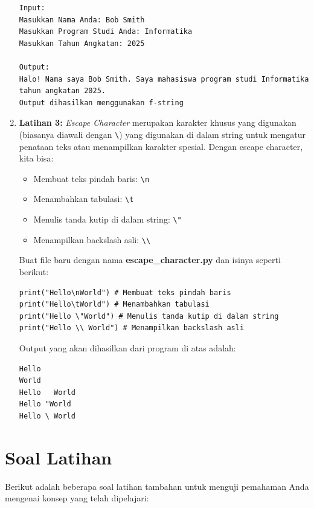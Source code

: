 \begin{enumerate}
\begin{verbatim}
Input:
Masukkan Nama Anda: Bob Smith
Masukkan Program Studi Anda: Informatika
Masukkan Tahun Angkatan: 2025

Output:
Halo! Nama saya Bob Smith. Saya mahasiswa program studi Informatika tahun angkatan 2025. 
Output dihasilkan menggunakan f-string
\end{verbatim}

\item \textbf{Latihan 3:} \textit{Escape Character} merupakan karakter khusus yang digunakan (biasanya diawali dengan \texttt{\textbackslash}) yang digunakan di dalam string untuk mengatur penataan teks atau menampilkan karakter spesial. Dengan escape character, kita bisa:

\begin{itemize}
    \item Membuat teks pindah baris: \texttt{\textbackslash n}
    \item Menambahkan tabulasi: \texttt{\textbackslash t}
    \item Menulis tanda kutip di dalam string: \texttt{\textbackslash "}
    \item Menampilkan backslash asli: \texttt{\textbackslash\textbackslash}
\end{itemize}

Buat file baru dengan nama \textbf{escape_character.py} dan isinya seperti berikut:

\begin{lstlisting}[style=PythonStyle, caption={Latihan 3}]
print("Hello\nWorld") # Membuat teks pindah baris
print("Hello\tWorld") # Menambahkan tabulasi
print("Hello \"World") # Menulis tanda kutip di dalam string
print("Hello \\ World") # Menampilkan backslash asli
\end{lstlisting}

Output yang akan dihasilkan dari program di atas adalah:

\begin{verbatim}
Hello
World
Hello	World
Hello "World
Hello \ World
\end{verbatim}
\end{enumerate}

\section{Soal Latihan}

Berikut adalah beberapa soal latihan tambahan untuk menguji pemahaman Anda mengenai konsep yang telah dipelajari:

